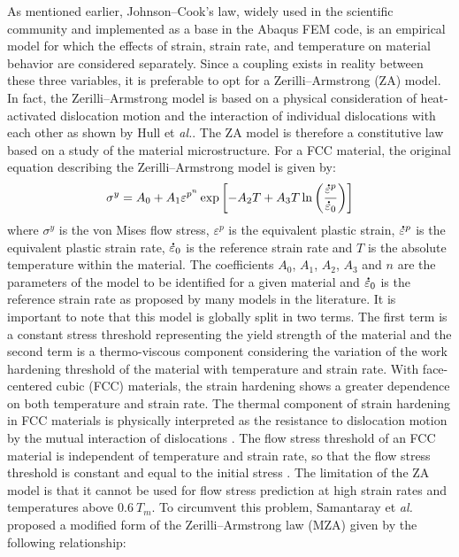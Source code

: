 \documentclass[twoside,english,1p,final,sort&compress]{elsarticle}
\makeatletter
\theoremstyle{plain}
\newcommand{\mdot}[1]{\accentset{\mbox{\bfseries .}}{#1}}
\newcommand*{\eal}{et \emph{al.}\@\xspace}
\makeatother
\begin{document}
As mentioned earlier, Johnson--Cook's law, widely used in the scientific community and implemented as a base in the Abaqus FEM code, is an empirical model for which the effects of strain, strain rate, and temperature on material behavior are considered separately. Since a coupling exists in reality between these three variables, it is preferable to opt for a Zerilli--Armstrong (ZA) model. In fact, the Zerilli--Armstrong model is based on a physical consideration of heat-activated dislocation motion and the interaction of individual dislocations with each other as shown by Hull \eal \cite{Hull-2011-ITD}. The ZA model is therefore a constitutive law based on a study of the material microstructure. For a FCC material, the original equation describing the Zerilli--Armstrong model \cite{Zerilli-1987-DMB} is given by:
\begin{equation}
\label{eq:ZA-model}
\sigma^y = A_{0} + A_{1}\varepsilon^{p^n} \exp\left[-A_{2}T + A_{3}T\ln\left( \frac{\mdot{\varepsilon}^p}{\mdot{\varepsilon}_0}\right)\right]
\end{equation}
where $\sigma^y$ is the von Mises flow stress, $\varepsilon^p$ is the equivalent plastic strain, $\mdot{\varepsilon}^p$ is the equivalent plastic strain rate, $\mdot{\varepsilon}_0$ is the reference strain rate and $T$ is the absolute temperature within the material. The coefficients $A_0$, $A_1$, $A_2$, $A_3$ and $n$ are the parameters of the model to be identified for a given material and $\mdot{\varepsilon}_0$ is the reference strain rate as proposed by many models in the literature.
It is important to note that this model is globally split in two terms. The first term is a constant stress threshold representing the yield strength of the material and the second term is a thermo-viscous component considering the variation of the work hardening threshold of the material with temperature and strain rate.
With face-centered cubic (FCC) materials, the strain hardening shows a greater dependence on both temperature and strain rate. The thermal component of strain hardening in FCC materials is physically interpreted as the resistance to dislocation motion by the mutual interaction of dislocations \cite{Voyia-2005-MBM}. The flow stress threshold of an FCC material is independent of temperature and strain rate, so that the flow stress threshold is constant and equal to the initial stress \cite{Nemat-2004-Plasticity, Voyia-2005-MBM}. The limitation of the ZA model is that it cannot be used for flow stress prediction at high strain rates and temperatures above $0.6~T_m$. To circumvent this problem, Samantaray \eal \cite{Samantaray-2009-Thermo-viscoplastic} proposed a modified form of the Zerilli--Armstrong law (MZA) given by the following relationship:
\end{document}

